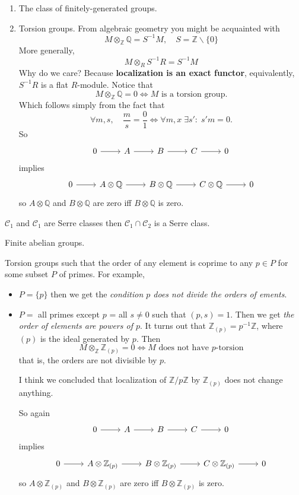 \documentclass{article}
\newcommand{\Q}{\mathbb{Q}}
\newcommand{\Z}{\mathbb{Z}}
\newcommand{\Cc}{\mathcal{C}}
\begin{document}
\begin{example}\leavevmode
	\begin{enumerate}
		\item The class of finitely-generated groups.
		\item Torsion groups. From algebraic geometry you might be acquainted with
		\[M\otimes_\Z\Q=S^{-1}M,\quad S=\Z\backslash\{0\}\]
		More generally,
		\[M\otimes_RS^{-1}R=S^{-1}M\]
		Why do we care? Because \textbf{localization is an exact functor}, equivalently, $S^{-1}R$ is a flat $R$-module. Notice that
		\[M\otimes_\Z\Q=0\iff M\text{ is a torsion group.}\]
		Which follows simply from the fact that
		\[\forall m,s,\quad\frac{m}{s}=\frac{0}{1}\iff\forall m,x\;\exists s':\; s'm=0.\]
		So
			\[\begin{tikzcd}
			0\arrow[r]&A\arrow[r]&B\arrow[r]&C\arrow[r]&0
		\end{tikzcd}\]
		implies
			\[\begin{tikzcd}
			0\arrow[r]&A\otimes\Q\arrow[r]&B\otimes\Q\arrow[r]&C\otimes\Q\arrow[r]&0
		\end{tikzcd}\]
		so $A\otimes\Q$ and $B\otimes\Q$ are zero iff $B\otimes\Q$ is zero.
	\end{enumerate}
	\item $\Cc_1$ and $\Cc_1$ are Serre classes then $\Cc_1\cap\Cc_2$ is a Serre class.
	\item Finite abelian groups.
	\item Torsion groups such that the order of any element is coprime to any $p\in P$ for some subset $P$ of primes. For example,
	\begin{itemize}
		\item $P=\{p\}$ then we get the \textit{condition $p$ does not divide the orders of ements}.
		\item $P=$ all primes except $p$ = all $s\neq0$ such that $(p,s)=1$. Then we get \textit{the order of elements are powers of $p$}. It turns out that $\Z_{(p)}=p^{-1}\Z$, where $(p)$ is the ideal generated by $p$. Then
		\[M\otimes_\Z\Z_{(p)}=0\iff M\text{ does not have } p\text{-torsion}\]
		that is, the orders are not divisible by $p$.
		
		{\color{red}I think} we concluded that localization of $\Z/p\Z$ by $\Z_{(p)}$ does not change anything.
		
		So again
		\[\begin{tikzcd}
			0\arrow[r]&A\arrow[r]&B\arrow[r]&C\arrow[r]&0
		\end{tikzcd}\]
		implies
		\[\begin{tikzcd}
			0\arrow[r]&A\otimes\Z_{(p)}\arrow[r]&B\otimes\Z_{(p)}\arrow[r]&C\otimes\Z_{(p)}\arrow[r]&0
		\end{tikzcd}\]
		so $A\otimes\Z_{(p)}$ and $B\otimes\Z_{(p)}$ are zero iff $B\otimes\Z_{(p)}$ is zero.
	\end{itemize}
\end{example}
\end{document}
